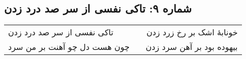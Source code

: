 \begin{center}
\section*{شماره ۹: تاکی نفسی از سر صد درد زدن}
\label{sec:009}
\begin{longtable}{l p{0.5cm} r}
تاکی نفسی از سر صد درد زدن
&&
خونابهٔ اشک بر رخ زرد زدن
\\
چون هست دل چو آهنت بر من سرد
&&
بیهوده بود بر آهن سرد زدن
\\
\end{longtable}
\end{center}
